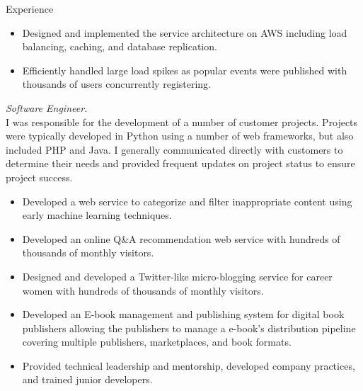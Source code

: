\documentclass{resume}
\begin{document}
\begin{category}{Experience}
\begin{itemize}
\begin{itemize}
            \item Designed and implemented the service architecture on AWS
                including load balancing, caching, and database replication.

            \item Efficiently handled large load spikes as popular events were
                published with thousands of users concurrently registering.

        \end{itemize}


         \emph{Software Engineer.}\\
            I was responsible for the development of a number of customer
            projects. Projects were typically developed in Python using a number
            of web frameworks, but also included PHP and Java. I generally
            communicated directly with customers to determine their needs and
            provided frequent updates on project status to ensure project
            success.

        \begin{itemize}

            \item Developed a web service to categorize and filter inappropriate
                content using early machine learning techniques.

            \item Developed an online Q\&A recommendation web service with
                hundreds of thousands of monthly visitors.

            \item Designed and developed a Twitter-like micro-blogging service
                for career women with hundreds of thousands of monthly visitors.

            \item Developed an E-book management and publishing system for
                digital book publishers allowing the publishers to manage a
                e-book's distribution pipeline covering multiple publishers,
                marketplaces, and book formats.

            \item Provided technical leadership and mentorship, developed
                company practices, and trained junior developers.

        \end{itemize}

    \end{itemize}


\end{category}
\end{document}

